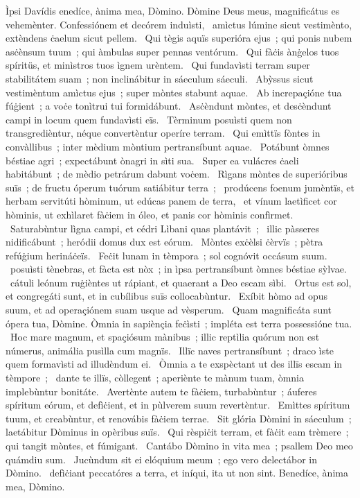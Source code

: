 { Ìpsi Davídis}
{%
enedíce, ànima mea, Dòmino. Dòmine Deus meus, magnificátus es vehemènter. Confessiónem et decórem induìsti, 
~amìctus lúmine sicut vestimènto, extèndens ċaelum sicut pellem. 
~Qui tègis aquïs superióra ejus~; qui ponis nubem asċènsum tuum~; qui àmbulas super pennas ventórum. 
~Qui fàċis ànġelos tuos spíritüs, et minìstros tuos ìgnem urèntem. 
~Qui fundavìsti terram super stabilitátem suam~; non inclinábitur in sáeculum sáeculi. 
~Abỳssus sicut vestimèntum amìctus ejus~; super mòntes stabunt aquae. 
~Ab increpaçióne tua fúġient~; a voċe tonìtrui tui formidábunt. 
~Asċèndunt mòntes, et desċèndunt campi in locum quem fundavìsti eïs. 
~Tèrminum posuìsti quem non transgredièntur, néque convertèntur operíre terram. 
~Qui emìttïs fòntes in convàllibus~; inter mèdium mòntium pertransíbunt aquae. 
~Potábunt òmnes béstiae agri~; expectábunt ònagri in sìti sua. 
~Super ea vulácres ċaeli habitábunt~; de mèdio petrárum dabunt voċem. 
~Rìgans mòntes de superióribus suïs~; de fructu óperum tuórum satiábitur terra~; 
~prodúcens foenum jumèntïs, et herbam servitúti hòminum, ut edúcas panem de terra, 
~et vínum laetìficet cor hòminis, ut exhìlaret fàċiem in óleo, et panis cor hòminis confìrmet. 
~Saturabùntur lìgna campi, et cédri Lìbani quas plantávit~;
~illic pàsseres nidificábunt~; heródii domus dux est eórum. 
~Mòntes exċèlsi ċèrvïs~; pètra refúġium herináċeïs. 
~Feċit lunam in tèmpora~; sol cognóvit occásum suum. 
~posuìsti tènebras, et fàcta est nòx~; in ìpsa pertransíbunt òmnes béstiae sỳlvae. 
~cátuli leónum ruġièntes ut rápiant, et quaerant a Deo escam sìbi. 
~Ortus est sol, et congregáti sunt, et in cubílibus suïs collocabùntur. 
~Exíbit hòmo ad opus suum, et ad operaçiónem suam usque ad vèsperum. 
~Quam magnificáta sunt ópera tua, Dòmine. Òmnia in sapiènçia feċìsti~; impléta est terra possessióne tua. 
~Hoc mare magnum, et spaçiósum mànibus~; illic reptìlia quórum non est númerus, animália pusìlla cum magnïs. 
~Illïc naves pertransíbunt~; draco ìste quem formavìsti ad illudèndum ei. 
~Òmnia a te exspèctant ut des illïs escam in tèmpore~; 
~dante te illïs, còllegent~; aperiènte te mànum tuam, òmnia implebùntur bonitáte. 
~Avertènte autem te fàċiem, turbabùntur~; áuferes spíritum eórum, et defìċient, et in pùlverem suum revertèntur. 
~Emìttes spíritum tuum, et creabùntur, et renovábis fàċiem terrae. 
~Sit glória Dòmini in sáeculum~; laetábitur Dòminus in opèribus suïs. 
~Qui rèspiċit terram, et fàċit eam trèmere~; qui tangit mòntes, et fúmigant. 
~Cantábo Dòmino in vita mea~; psallem Deo meo quámdiu sum. 
~Jucùndum sit ei elóquium meum~; ego vero delectábor in Dòmino. 
~defìċiant peccatóres a terra, et iníqui, ita ut non sint. Benedíce, ànima mea, Dòmino. 
}

